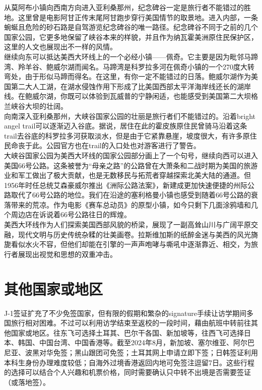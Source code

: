 \begin{itemize}
从莫阿布小镇向西南方向进入亚利桑那州，纪念碑谷一定是旅行者不能错过的胜地。这里曾是电影阿甘正传末尾阿甘跑步穿行美国情节的取景地。进入内部，一条蜿蜒且危险的砂石路是自驾游览纪念碑谷的唯一路径。纪念碑谷不同于之前的几个国家公园，它更多地保留了峡谷本来的样貌，并且作为纳瓦霍美洲原住民保护区，这里的人文也展现出不一样的风情。\\
继续向东可以抵达美西大环线上的一个必经小镇——佩奇。它主要是因为毗邻马蹄湾、羚羊谷、鲍威尔湖而闻名。马蹄湾是科罗拉多河在佩奇小镇的一个270度大转弯处，由于形似马蹄而得名。在这里，有你一定不能错过的日落。鲍威尔湖作为美国第二大人工湖，在湖水侵蚀作用下形成了比美国西部太平洋海岸线还长的湖岸线。在鲍威尔湖，你既可以体验到瓦威普的宁静闲适，也能感受到美国第二大坝格兰峡谷大坝的壮阔。\\
向南深入亚利桑那州，大峡谷国家公园的壮丽是旅行者们不能错过的。沿着bright angel trail可以逐渐迈入谷底。据说，居住在此的霍皮族原住民曾骑马沿着这条trail去谷底的科罗拉多河获取淡水，但是由于它紧靠悬崖，坡度很大，有许多原住民命丧于此。公园官方也在trail的入口处也对游客进行了警告。\\
大峡谷国家公园为美西大环线的国家公园部分画上了一个句号，继续向西可以进入美国66号公路。这条被誉为“母亲之路”的公路曾在大萧条和二战时期为美国的旅游业和军工做出了极大贡献，也是无数移民与拓荒者穿越探索北美大陆的通道。但1956年时任总统艾森豪威尔推出《洲际公路法案》，新建成更加快速便捷的州际公路取代了66号公路的地位。我们在沿途的塞利格曼小镇也感受到随着66号公路的衰落带来的荒凉。作为电影《赛车总动员》的原型小镇，如今只剩下几面涂鸦墙和几个周边店在诉说着66号公路往日的辉煌。\\
美西大环线作为人们探索美国西部风貌的桥梁，展现了一副高耸山川与广阔平原交融，现代文明与历史传统杂糅的壮美画卷。拉斯维加斯的纸醉金迷与美西的风光旖旎看似水火不容，但他们却能在引擎的一声声咆哮与嘶吼中逐渐靠近、相交，为旅行者展现出视觉和思想的双重冲击。

\end{itemize}

\section{其他国家或地区}
J-1签证扩充了不少免签国家，但有限的假期和繁杂的signature手续让访学期间多国旅行相对困难。不过可以利用访学结束至返校的一段时间，藉由航班中转前往其他国家或地区。往东飞可选择土耳其、巴尔干各国、新加坡等，往西飞可选择日本、韩国、中国台湾、中国香港等。截至2024年8月，新加坡、塞尔维亚、阿尔巴尼亚、波黑对华免签；黑山跟团可免签；土耳其网上申请立即下签；日韩签证利用本科生身份办理难度较低；自海外过境香港返回内地可免签注逗留7日。这些行程的选择可以结合个人兴趣和机票价格，同时需要确认只中转不出境是否需要签证（或落地签）。

